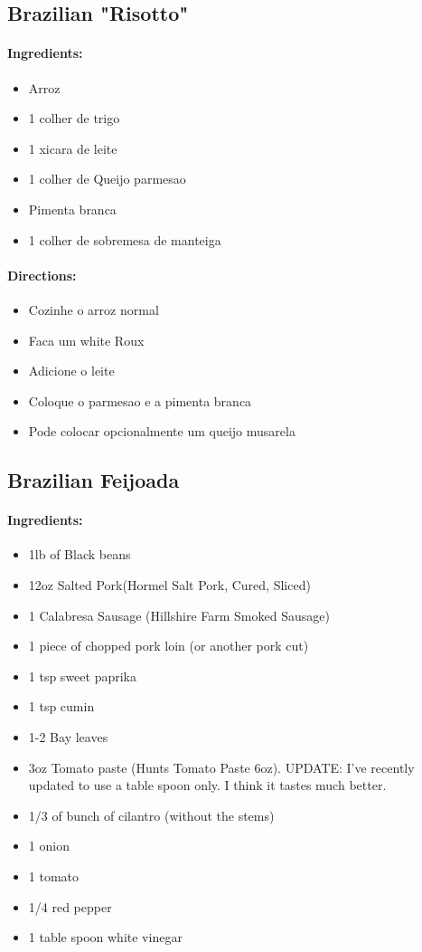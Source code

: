 \documentclass{article}
\begin{document}
\subsection{Brazilian "Risotto"}

\paragraph{Ingredients:}
\begin{itemize}
    \item Arroz
    \item 1 colher de trigo
    \item 1 xicara de leite
    \item 1 colher de Queijo parmesao
    \item Pimenta branca
    \item 1 colher de sobremesa de manteiga
\end{itemize}

\paragraph{Directions:}
\begin{itemize}
    \item Cozinhe o arroz normal
    \item Faca um white Roux
    \item Adicione o leite
    \item Coloque o parmesao e a pimenta branca
    \item Pode colocar opcionalmente um queijo musarela
\end{itemize}

\subsection{Brazilian Feijoada}

\paragraph{Ingredients:}
\begin{itemize}
    \item 1lb of Black beans
    \item 12oz Salted Pork(Hormel Salt Pork, Cured, Sliced)
    \item 1 Calabresa Sausage (Hillshire Farm Smoked Sausage)
    \item 1 piece of chopped pork loin (or another pork cut)
    \item 1 tsp sweet paprika
    \item 1 tsp cumin
    \item 1-2 Bay leaves
    \item 3oz Tomato paste (Hunts Tomato Paste 6oz). UPDATE: I've recently updated to use a table spoon only.  I think it tastes much better.
    \item 1/3 of bunch of cilantro (without the stems)
    \item 1 onion
    \item 1 tomato
    \item 1/4 red pepper
    \item 1 table spoon white vinegar
\end{itemize}
\end{document}
